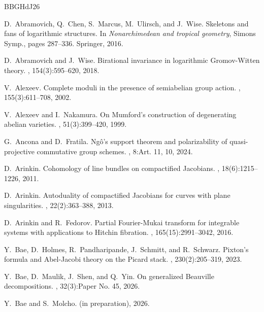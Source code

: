\documentclass[11pt]{article}
\theoremstyle{definition}
\begin{document}
\newcommand{\etalchar}[1]{$^{#1}$}
\begin{thebibliography}{BBGHdJ26}

\bibitem[ACM{\etalchar{+}}16]{SkeletonsAndFAbramo2015}
D.~Abramovich, Q.~Chen, S.~Marcus, M.~Ulirsch, and J.~Wise.
\newblock Skeletons and fans of logarithmic structures.
\newblock In {\em Nonarchimedean and tropical geometry}, Simons Symp., pages 287--336. Springer, 2016.

D.~Abramovich and J.~Wise.
\newblock Birational invariance in logarithmic {G}romov-{W}itten theory.
, 154(3):595--620, 2018.

V.~Alexeev.
\newblock Complete moduli in the presence of semiabelian group action.
, 155(3):611--708, 2002.

V.~Alexeev and I.~Nakamura.
\newblock On {M}umford's construction of degenerating abelian varieties.
, 51(3):399--420, 1999.

G.~Ancona and D.~Fratila.
\newblock Ng\^o's support theorem and polarizability of quasi-projective commutative group schemes.
, 8:Art. 11, 10, 2024.

D.~Arinkin.
\newblock Cohomology of line bundles on compactified {J}acobians.
, 18(6):1215--1226, 2011.

D.~Arinkin.
\newblock Autoduality of compactified {J}acobians for curves with plane singularities.
, 22(2):363--388, 2013.

D.~Arinkin and R.~Fedorov.
\newblock Partial {F}ourier-{M}ukai transform for integrable systems with applications to {H}itchin fibration.
, 165(15):2991--3042, 2016.

\bibitem[BHP{\etalchar{+}}23]{BHPSS}
Y.~Bae, D.~Holmes, R.~Pandharipande, J.~Schmitt, and R.~Schwarz.
\newblock Pixton's formula and {A}bel-{J}acobi theory on the {P}icard stack.
, 230(2):205--319, 2023.

Y.~Bae, D.~Maulik, J.~Shen, and Q.~Yin.
\newblock On generalized {B}eauville decompositions.
, 32(3):Paper No. 45, 2026.

Y.~Bae and S.~Molcho.
\newblock (in preparation), 2026.


\end{thebibliography}
\end{document}
